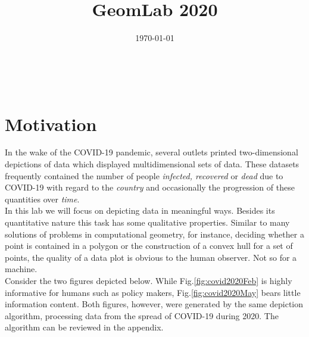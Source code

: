 \documentclass[a4paper,11pt]{article}
\makeatletter
\renewcommand{\maketitle}{
  \begin{center}
    \vspace{2ex}
    {\huge \textsc{\@title}}
    \vspace{1ex}
    \\
    \@author \hfill \@date
    \vspace{4ex}
  \end{center}
}
\makeatother
\begin{document}

\title{GeomLab 2020}
\author{}
\date{\today}
\maketitle

\tableofcontents

\newpage

\section{Motivation}

In the wake of the COVID-19 pandemic, several outlets printed two-dimensional depictions of data which displayed multidimensional sets of data. These datasets frequently contained the number of people \textit{infected, recovered} or \textit{dead} due to COVID-19 with regard to the \textit{country} and occasionally the progression of these quantities over \textit{time}.\\

In this lab we will focus on depicting data in meaningful ways. Besides its quantitative nature this task has some qualitative properties. Similar to many solutions of problems in computational geometry, for instance, deciding whether a point is contained in a polygon or the construction of a convex hull for a set of points, the quality of a data plot is obvious to the human observer. Not so for a machine.\\

Consider the two figures depicted below. While Fig.\ref{fig:covid2020Feb} is highly informative for humans such as policy makers, Fig.\ref{fig:covid2020May} bears little information content. Both figures, however, were generated by the same depiction algorithm, processing data from the spread of COVID-19 during 2020. The algorithm can be reviewed in the appendix.\\
\end{document}
